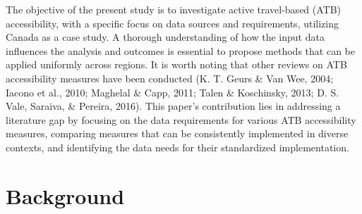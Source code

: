 \documentclass[
11pt, %
oneside, %
english, %
singlespacing, %
]{macthesis} %
\begin{document}
The objective of the present study is to investigate active travel-based (ATB) accessibility, with a specific focus on data sources and requirements, utilizing Canada as a case study. A thorough understanding of how the input data influences the analysis and outcomes is essential to propose methods that can be applied uniformly across regions. It is worth noting that other reviews on ATB accessibility measures have been conducted (K. T. Geurs \& Van Wee, 2004; Iacono et al., 2010; Maghelal \& Capp, 2011; Talen \& Koschinsky, 2013; D. S. Vale, Saraiva, \& Pereira, 2016). This paper's contribution lies in addressing a literature gap by focusing on the data requirements for various ATB accessibility measures, comparing measures that can be consistently implemented in diverse contexts, and identifying the data needs for their standardized implementation.

\section{Background}\label{background}
\end{document}
